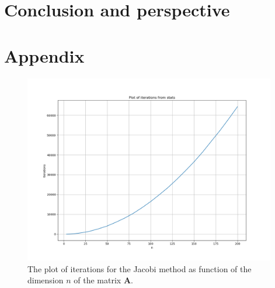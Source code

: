 \documentclass{article}
\begin{document}

\vspace{1cm}

\section{Conclusion and perspective} \label{sec:Conclusion}



\vspace{1cm}

\section{Appendix} \label{sec:Appendix}

\begin{figure}[ht]
	\centering
	\includegraphics[width = 11cm]{iterations-stats.png}
	\caption{The plot of iterations for the Jacobi method as function of the dimension $n$ of the matrix \textbf{A}. }
  \label{fig:iterationspng}
\end{figure}
\end{document}
